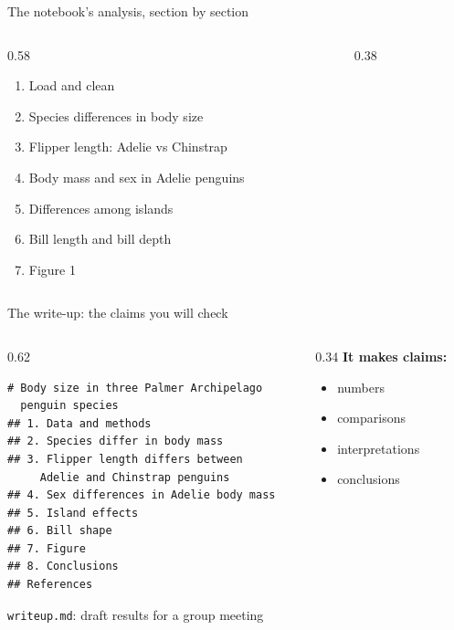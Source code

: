 \begin{frame}{The notebook's analysis, section by section}
  \vfill
  \begin{columns}[c]
    \begin{column}{0.58\textwidth}
      \begin{enumerate}\large\setlength\itemsep{0.5em}
        \item Load and clean
        \item Species differences in body size
        \item Flipper length: Adelie vs Chinstrap
        \item Body mass and sex in Adelie penguins
        \item Differences among islands
        \item Bill length and bill depth
        \item Figure 1
      \end{enumerate}
    \end{column}
    \begin{column}{0.38\textwidth}
    \end{column}
  \end{columns}
  \vspace{1.5cm plus 1fill}
\end{frame}

\begin{frame}[fragile]{The write-up: the claims you will check}
  \vfill
  \begin{columns}[c]
    \begin{column}{0.62\textwidth}
      \begin{lstlisting}[basicstyle=\ttfamily\footnotesize, breaklines=false]
# Body size in three Palmer Archipelago
  penguin species
## 1. Data and methods
## 2. Species differ in body mass
## 3. Flipper length differs between
     Adelie and Chinstrap penguins
## 4. Sex differences in Adelie body mass
## 5. Island effects
## 6. Bill shape
## 7. Figure
## 8. Conclusions
## References
      \end{lstlisting}
      {\small \texttt{writeup.md}: draft results for a group meeting}
    \end{column}
    \begin{column}{0.34\textwidth}
      \textbf{It makes claims:}
      \begin{itemize}\large\setlength\itemsep{0.5em}
        \item numbers
        \item comparisons
        \item interpretations
        \item conclusions
      \end{itemize}
    \end{column}
  \end{columns}
  \vspace{1.5cm plus 1fill}
\end{frame}


